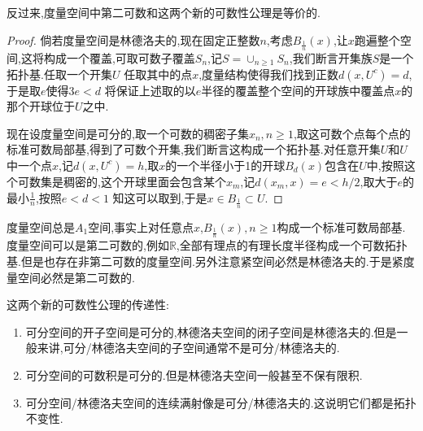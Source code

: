 反过来,度量空间中第二可数和这两个新的可数性公理是等价的.
\begin{proof}
	
倘若度量空间是林德洛夫的,现在固定正整数$n$,考虑$B_{\frac{1}{n}}(x)$,让$x$跑遍整个空间,这将构成一个覆盖,可取可数子覆盖$S_n$,记$S=\cup_{n\ge1}S_n$,我们断言开集族$S$是一个拓扑基.任取一个开集$U$ 任取其中的点$x$,度量结构使得我们找到正数$d(x,U^c)=d$,于是取$e$使得$3e<d$ 将保证上述取的以$e$半径的覆盖整个空间的开球族中覆盖点$x$的那个开球位于$U$之中.

现在设度量空间是可分的,取一个可数的稠密子集$x_n,n\ge1$,取这可数个点每个点的标准可数局部基,得到了可数个开集,我们断言这构成一个拓扑基.对任意开集$U$和$U$中一个点$x$,记$d(x,U^c)=h$,取$x$的一个半径小于1的开球$B_d(x)$包含在$U$中,按照这个可数集是稠密的,这个开球里面会包含某个$x_m$,记$d(x_m,x)=e<h/2$,取大于$e$的最小$\frac{1}{n}$,按照$e<d<1$ 知这可以取到,于是$x\in B_{\frac{1}{n}}\subset U$.
\end{proof}

度量空间总是$A_1$空间,事实上对任意点$x$,$B_{\frac{1}{n}}(x),n\ge1$构成一个标准可数局部基.度量空间可以是第二可数的,例如$\mathbb{R}$,全部有理点的有理长度半径构成一个可数拓扑基.但是也存在非第二可数的度量空间.另外注意紧空间必然是林德洛夫的.于是紧度量空间必然是第二可数的.

这两个新的可数性公理的传递性:
\begin{enumerate}
	\item 可分空间的开子空间是可分的,林德洛夫空间的闭子空间是林德洛夫的.但是一般来讲,可分/林德洛夫空间的子空间通常不是可分/林德洛夫的.
	\item 可分空间的可数积是可分的.但是林德洛夫空间一般甚至不保有限积.
	\item 可分空间/林德洛夫空间的连续满射像是可分/林德洛夫的.这说明它们都是拓扑不变性.
\end{enumerate}

